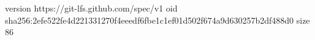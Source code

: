version https://git-lfs.github.com/spec/v1
oid sha256:2efe522fe4d221331270f4eeedf6fbe1c1ef01d502f674a9d630257b2df488d0
size 86
